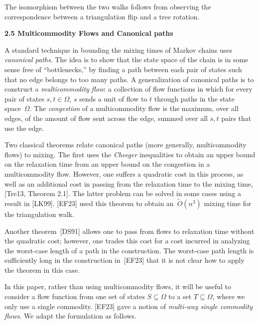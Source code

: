 \documentclass[10pt,a4paper]{article}
\begin{document}
The isomorphism between the two walks follows from observing the correspondence between a triangulation flip and a tree rotation.\par





\par\medskip\noindent\textbf{2.5 Multicommodity Flows and Canonical paths}\par




A standard technique in bounding the mixing times of Markov chains uses \emph{canonical paths}. The idea is to show that the state space of the chain is in some sense free of “bottlenecks,” by finding a path between each pair of states such that no edge belongs to too many paths. A generalization of canonical paths is to construct a \emph{multicommodity flow}: a collection of flow functions in which for every pair of states $s,t\in\Omega$, $s$ sends a unit of flow to $t$ through paths in the state space $\Omega$. The \emph{congestion} of a multicommodity flow is the maximum, over all edges, of the amount of flow sent across the edge, summed over all $s,t$ pairs that use the edge.\par




Two classical theorems relate canonical paths (more generally, multicommodity flows) to mixing. The first uses the \emph{Cheeger} inequalities to obtain an upper bound on the relaxation time from an upper bound on the congestion in a multicommodity flow. However, one suffers a quadratic cost in this process, as well as an additional cost in passing from the relaxation time to the mixing time, [Tre13, Theorem 2.1]. The latter problem can be solved in some cases using a result in [LK99]. [EF23] used this theorem to obtain an $\widetilde{O}(n^{3})$ mixing time for the triangulation walk.\par




Another theorem [DS91] allows one to pass from flows to relaxation time without the quadratic cost; however, one trades this cost for a cost incurred in analyzing the worst-case length of a path in the construction. The worst-case path length is sufficiently long in the construction in [EF23] that it is not clear how to apply the theorem in this case.\par




In this paper, rather than using multicommodity flows, it will be useful to consider a flow function from one set of states $S\subseteq\Omega$ to a set $T\subseteq\Omega$, where we only use a single commodity. [EF23] gave a notion of \emph{multi-way single commodity flows}. We adapt the formulation as follows.\par
\end{document}
